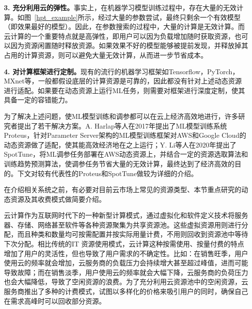 \textbf{3. 充分利用云的弹性。}事实上，在机器学习模型训练过程中，存在大量的无效计算。如图~\ref{hpt_example}所示，经过大量的参数尝试，最终只剩余一个有效模型（即效果最好的模型）。因此，在参数搜索的过程中，大量的计算是无效计算。而云计算的一个重要特点就是高弹性，即用户可以因为负载增加随时获取资源，也可以因为资源闲置随时释放资源。如果效果不好的模型能够被提前发现，并释放掉其占用的计算资源，则可以避免大量无效计算，从而进一步节省成本。

\textbf{4. 对计算框架进行定制。}现有的流行的机器学习框架如Tensorflow，PyTorch，MXnet等，一般都假设底层的计算资源是可靠的，因此都没有针对上述动态资源进行适配。如果要在动态资源上运行ML任务，则需要对框架进行深度定制，使其具备一定的容错能力。

为了解决上述问题，使ML模型训练和调参都可以在云上经济高效地进行，许多研究者提出了若干解决方案。A. Harlap等人在2017年提出了ML模型训练系统Proteus\parencite{harlap2017proteus}，针对Parameter Server架构的ML模型训练框架对AWS和Google Cloud的动态资源做了适配，使其能高效经济地在之上运行；Y. Li等人在2020年提出了SpotTune\parencite{li2020spottune}，将ML调参任务部署在AWS动态资源上，并结合一定的资源选取算法和训练趋势预测算法，使调参任务节省大量的无效计算，最终达到了经济高效的目的。下文对较有代表性的Proteus和SpotTune做较为详细的介绍。

在介绍相关系统之前，有必要对目前云市场上常见的资源类型、本节重点研究的动态资源及其收费模式做简要介绍。

云计算作为互联网时代下的一种新型计算模式，通过虚拟化和软件定义技术将服务器、存储、网络甚至软件等各种资源聚集为共享资源池。这些虚拟资源用则进行分配，而且种类和数量均可按需配置并按实际用量计费，不用则回收到资源池中等待下次分配。相比传统的IT 资源使用模式，云计算这种按需使用、按量付费的特点增加了用户的灵活性，但也导致了用户需求的不确定性。比如：在销售旺季，用户使用云的频率就会增加，云服务商的负载压力会持续增大甚至超过峰值，进而可能导致故障；而在销售淡季，用户使用云的频率就会大幅下降，云服务商的负荷压力也会大幅降低，导致了空闲资源的浪费。为了充分利用云资源池中的空闲资源，云服务商推出了多种的计费模式，试图以多样化的价格来吸引用户的同时，确保自己在需求高峰时可以回收部分资源。

